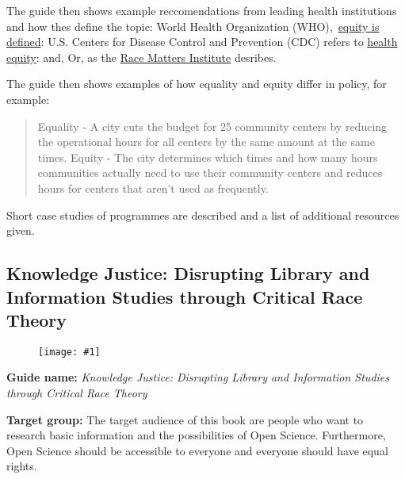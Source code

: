 \documentclass{article}
\newlength{\imgwidth}
\newcommand\scaledgraphics[2]{%
                
\settowidth{\imgwidth}{\texttt{[image: \#1]}}%
                
\setlength{\imgwidth}{\minof{\imgwidth}{#2\textwidth}}%
                
\texttt{[image: \#1]}%
                
}
\begin{document}
The guide then shows example reccomendations from leading health institutions and how thes define the topic: World Health Organization (WHO), \href{https://www.who.int/healthsystems/topics/equity/en/}{equity is defined}:  U.S. Centers for Disease Control and Prevention (CDC) refers to \href{https://www.cdc.gov/minorityhealth/strategies2016/index.html}{health equity}: and, Or, as the \href{http://viablefuturescenter.org/racemattersinstitute/}{Race Matters Institute} desribes.


The guide then shows examples of how equality and equity differ in policy, for example: 

\begin{quote}



Equality - A city cuts the budget for 25 community centers by reducing the operational hours for all centers by the same amount at the same times. Equity - The city determines which times and how many hours communities actually need to use their community centers and reduces hours for centers that aren’t used as frequently.


\end{quote}


Short case studies of programmes are described and a list of additional resources given.


\subsection{Knowledge Justice: Disrupting Library and Information Studies through Critical Race Theory}\label{H8244312}



\begin{center}
\begin{figure}
\scaledgraphics{dcc1d35b-4186-4b50-a5a6-cf54422a8064.jpeg}{0.75}
\label{F29320001}
\end{figure}


\end{center}


\textbf{Guide name:} \emph{Knowledge Justice: Disrupting Library and Information Studies through Critical Race Theory} \autocite{leung_knowledge_2021}


\textbf{Target group: }The target audience of this book are people who want to research basic information and the possibilities of Open Science. Furthermore, Open Science should be accessible to everyone and everyone should have equal rights.
\end{document}

